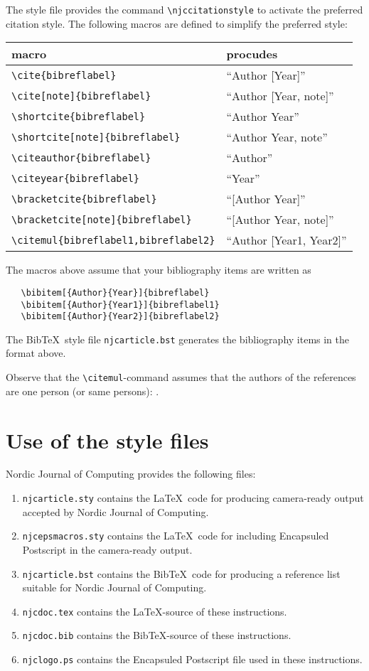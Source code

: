 The style file provides the command \verb|\njccitationstyle|
to activate the preferred citation style.
The following macros are defined to simplify the preferred style:
\begin{center}\begin{tabular}{ll}
 macro & procudes\\ \hline
 \verb|\cite{bibreflabel}| & ``Author [Year]''\\ 
 \verb|\cite[note]{bibreflabel}| & ``Author [Year, note]''\\ 
 \verb|\shortcite{bibreflabel}| & ``Author Year''\\ 
 \verb|\shortcite[note]{bibreflabel}| & ``Author Year, note''\\ 
 \verb|\citeauthor{bibreflabel}| & ``Author''\\ 
 \verb|\citeyear{bibreflabel}| & ``Year''\\ 
 \verb|\bracketcite{bibreflabel}| & ``[Author Year]''\\ 
 \verb|\bracketcite[note]{bibreflabel}| & ``[Author Year, note]''\\ 
 \verb|\citemul{bibreflabel1,bibreflabel2}| & ``Author [Year1, Year2]''\\ \hline
\end{tabular}\end{center}

The macros above assume that your bibliography items are written as
\begin{verbatim}
   \bibitem[{Author}{Year}]{bibreflabel}
   \bibitem[{Author}{Year1}]{bibreflabel1}
   \bibitem[{Author}{Year2}]{bibreflabel2}
\end{verbatim}
The Bib\TeX\ style file {\tt njcarticle.bst} generates
the bibliography items in the format above.

{\sc Observe} that the \verb|\citemul|-command assumes that
the authors of the references are one person (or same persons):
.

\section{Use of the style files}

{\sc Nordic Journal of Computing} provides the following files:
\begin{enumerate}
\item
{\tt njcarticle.sty} contains the \LaTeX\ code for producing camera-ready
	output accepted by {\sc Nordic Journal of Computing}.
\item
{\tt njcepsmacros.sty} contains the \LaTeX\ code for including Encapsuled
	Postscript in the camera-ready output.
\item
{\tt njcarticle.bst} contains the Bib\TeX\ code for producing a reference list
suitable for {\sc Nordic Journal of Computing}.
\item
{\tt njcdoc.tex} contains the \LaTeX-source of these instructions.
\item
{\tt njcdoc.bib} contains the Bib\TeX-source of these instructions.
\item
{\tt njclogo.ps} contains the Encapsuled Postscript file used in
	these instructions.
\end{enumerate}

